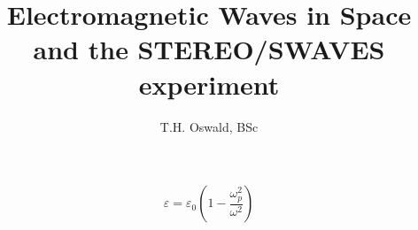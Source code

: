 \documentclass[a4paper,10pt]{thesis}
\title{Electromagnetic Waves in Space and the STEREO/SWAVES experiment}
\author{T.H. Oswald, BSc}
\begin{document}
\begin{equation}\label{epsilon_plasma}
    \varepsilon=\varepsilon_0 \left(1-\frac{\omega_p^2 }{ \omega^2 }\right)
\end{equation}
\end{document}
